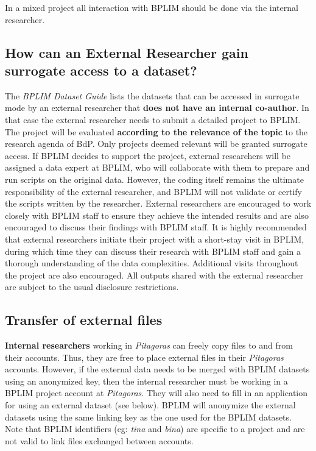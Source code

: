 \documentclass[
  a4paper,
  DIV=11,
  numbers=noendperiod]{scrartcl}
\begin{document}
In a mixed project all interaction with BPLIM should be done via the
internal researcher.

\hypertarget{how-can-an-external-researcher-gain-surrogate-access-to-a-dataset}{%
\subsection{How can an External Researcher gain surrogate access to a
dataset?}\label{how-can-an-external-researcher-gain-surrogate-access-to-a-dataset}}

The \emph{BPLIM Dataset Guide} lists the datasets that can be accessed
in surrogate mode by an external researcher that \textbf{does not have
an internal co-author}. In that case the external researcher needs to
submit a detailed project to BPLIM. The project will be evaluated
\textbf{according to the relevance of the topic} to the research agenda
of BdP. Only projects deemed relevant will be granted surrogate access.
If BPLIM decides to support the project, external researchers will be
assigned a data expert at BPLIM, who will collaborate with them to
prepare and run scripts on the original data. However, the coding itself
remains the ultimate responsibility of the external researcher, and
BPLIM will not validate or certify the scripts written by the
researcher. External researchers are encouraged to work closely with
BPLIM staff to ensure they achieve the intended results and are also
encouraged to discuss their findings with BPLIM staff. It is highly
recommended that external researchers initiate their project with a
short-stay visit in BPLIM, during which time they can discuss their
research with BPLIM staff and gain a thorough understanding of the data
complexities. Additional visits throughout the project are also
encouraged. All outputs shared with the external researcher are subject
to the usual disclosure restrictions.

\hypertarget{transfer-of-external-files}{%
\subsection{Transfer of external
files}\label{transfer-of-external-files}}

\textbf{Internal researchers} working in \emph{Pitagoras} can freely
copy files to and from their accounts. Thus, they are free to place
external files in their \emph{Pitagoras} accounts. However, if the
external data needs to be merged with BPLIM datasets using an anonymized
key, then the internal researcher must be working in a BPLIM project
account at \emph{Pitagoras}. They will also need to fill in an
application for using an external dataset (see below). BPLIM will
anonymize the external datasets using the same linking key as the one
used for the BPLIM datasets. Note that BPLIM identifiers (eg:
\emph{tina} and \emph{bina}) are specific to a project and are not valid
to link files exchanged between accounts.
\end{document}
